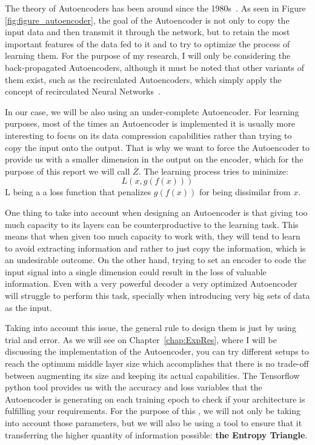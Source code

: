 The theory of Autoencoders has been around since the 1980s~\cite{Autoencoders_first_mention}. As seen in Figure \ref{fig:figure_autoencoder}, the goal of the Autoencoder is not only to copy the input data and then transmit it through the network, but to retain the most important features of the data fed to it and to try to optimize the process of learning them. For the purpose of my research, I will only be considering the back-propagated Autoencoders, although it must be noted that other variants of them exist, such as the recirculated Autoencoders, which simply apply the concept of recirculated Neural Networks~\cite{Recirculated_NN}. \par

In our case, we will be also using an under-complete Autoencoder. For learning purposes, most of the times an Autoencoder is implemented it is usually more interesting to focus on its data compression capabilities rather than trying to copy the input onto the output. That is why we want to force the Autoencoder to provide us with a smaller dimension in the output on the encoder, which for the purpose of this report we will call $\overline Z$. The learning process tries to minimize: 
%
\begin{equation}
L(x,g(f(x)))
\end{equation}
L being a a loss function that penalizes $g(f(x))$ for being dissimilar from $x$.

One thing to take into account when designing an Autoencoder is that giving too much capacity to its layers can be counterproductive to the learning task. This means that when given too much capacity to work with, they will tend to learn to avoid extracting information and rather to just copy the information, which is an undesirable outcome. On the other hand, trying to set an encoder to code the input signal into a single dimension could result in the loss of valuable information. Even with a very powerful decoder a very optimized Autoencoder will struggle to perform this task, specially when introducing very big sets of data as the input. \par

Taking into account this issue, the general rule to design them is just by using trial and error. As we will see on Chapter~\ref{chap:ExpRes}, where I will be discussing the implementation of the Autoencoder, you can try different setups to reach the optimum middle layer size which accomplishes that there is no trade-off between augmenting its size and keeping its actual capabilities. The Tensorflow python tool provides us with the accuracy and loss variables that the Autoencoder is generating on each training epoch to check if your architecture is fulfilling your requirements. For the purpose of this \bth, we will not only be taking into account those parameters, but we will also be using a tool to ensure that it transferring the higher quantity of information possible: \textbf{the Entropy Triangle}.

